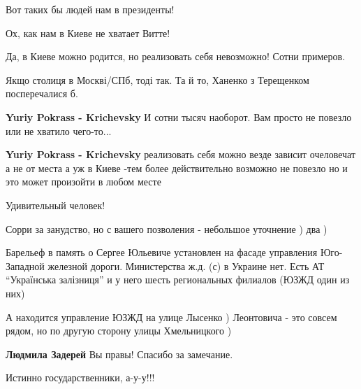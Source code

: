  
 
 
 
 
\zzSecCmt

\begin{itemize} %
Вот таких бы людей нам в президенты!

Ох, как нам в Киеве не хватает Витте!

Да, в Киеве можно родится, но реализовать себя невозможно! Сотни примеров.

\begin{itemize} %
Якщо столиця в Москві/СПб, тоді так. Та й то, Ханенко з Терещенком посперечалися б.

\textbf{Yuriy Pokrass - Krichevsky} И сотни тысяч наоборот. Вам просто не повезло или не хватило чего-то...

\textbf{Yuriy Pokrass - Krichevsky} реализовать себя можно везде зависит очеловечат а не от места а уж в Киеве -тем более действительно возможно не повезло но и это может произойти в любом месте
\end{itemize} %

Удивительный человек!


Сорри за занудство, но с вашего позволения - небольшое уточнение ) два )

Барельеф в память о Сергее Юльевиче установлен на фасаде управления
Юго-Западной железной дороги. Министерства ж.д. (с) в Украине нет. Есть АТ
\enquote{Українська залізниця} и у него шесть региональных филиалов (ЮЗЖД один из них)

А находится управление ЮЗЖД на улице Лысенко ) Леонтовича - это совсем рядом,
но по другую сторону улицы Хмельницкого )

\begin{itemize} %
\textbf{Людмила Задерей} Вы правы! Спасибо за замечание.
\end{itemize} %

Истинно государственники, а-у-у!!!


\end{itemize}

